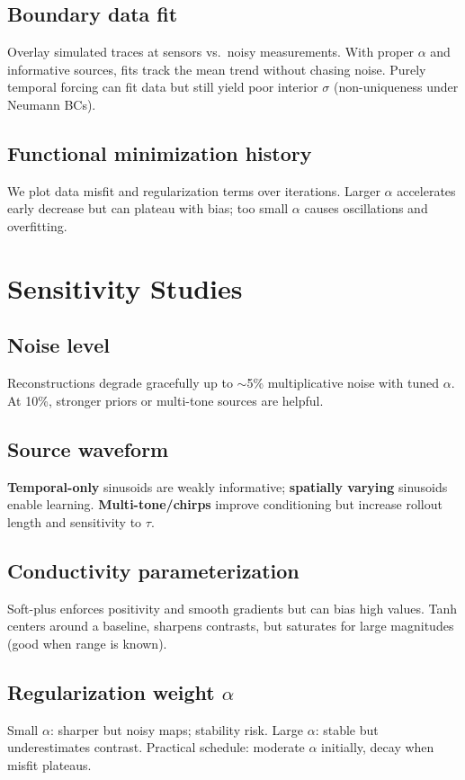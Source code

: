 \documentclass[11pt,a4paper]{article}
\numberwithin{equation}{section}
\begin{document}
\subsection{Boundary data fit}
Overlay simulated traces at sensors vs.\ noisy measurements. 
With proper $\alpha$ and informative sources, fits track the mean trend without chasing noise.
Purely temporal forcing can fit data but still yield poor interior $\sigma$ (non-uniqueness under Neumann BCs).

\subsection{Functional minimization history}
We plot data misfit and regularization terms over iterations. 
Larger $\alpha$ accelerates early decrease but can plateau with bias; too small $\alpha$ causes oscillations and overfitting.

\section{Sensitivity Studies}
\label{sec:sensitivity}

\subsection{Noise level}
Reconstructions degrade gracefully up to $\sim$5\% multiplicative noise with tuned $\alpha$.
At 10\%, stronger priors or multi-tone sources are helpful.

\subsection{Source waveform}
\textbf{Temporal-only} sinusoids are weakly informative; \textbf{spatially varying} sinusoids enable learning.
\textbf{Multi-tone/chirps} improve conditioning but increase rollout length and sensitivity to $\tau$.

\subsection{Conductivity parameterization}
Soft-plus enforces positivity and smooth gradients but can bias high values. 
Tanh centers around a baseline, sharpens contrasts, but saturates for large magnitudes (good when range is known).

\subsection{Regularization weight $\alpha$}
Small $\alpha$: sharper but noisy maps; stability risk. 
Large $\alpha$: stable but underestimates contrast. 
Practical schedule: moderate $\alpha$ initially, decay when misfit plateaus.
\end{document}
